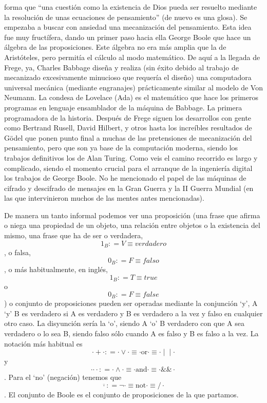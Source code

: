 \documentclass[
]{article}
\begin{document}
\begin{enumerate}
  forma que ``una cuestión como la existencia de Dios pueda ser resuelto
  mediante la resolución de unas ecuaciones de pensamiento'' (de nuevo
  es una glosa). Se empezaba a buscar con ansiedad una mecanización del
  pensamiento. Esta idea fue muy fructífera, dando un primer paso hacia
  ella George Boole que hace un ál\-gebra de las proposiciones. Este
  álgebra no era más amplia que la de Aristóteles, pero permitía el
  cálculo al modo matemático. De aquí a la llegada de Frege, ya, Charles
  Babbage diseña y realiza (sin éxito debido al trabajo de mecanizado
  ex\-cesivamente minucioso que requería el diseño) una computadora
  universal me\-cánica (mediante engranajes) prácticamente similar al
  modelo de Von Neumann. La condesa de Lovelace (Ada) es el matemático
  que hace los primeros progra\-mas en lenguaje ensamblador de la
  máquina de Babbage. La primera programa\-dora de la historia. Después
  de Frege siguen los desarrollos con gente como Ber\-trand Rusell,
  David Hilbert, y otros hasta los increíbles resultados de Gödel que
  ponen punto final a muchas de las pretensiones de mecanización del
  pensamiento, pero que son ya base de la computación moderna, siendo
  los trabajos definitivos los de Alan Turing. Como veis el camino
  recorrido es largo y complicado, siendo el momento crucial para el
  arranque de la ingeniería digital los trabajos de George Boole. No he
  mencionado el papel de las máquinas de cifrado y descifrado de
  mensajes en la Gran Guerra y la II Guerra Mundial (en las que
  intervinieron muchos de las mentes antes mencionadas).

  De manera un tanto informal podemos ver una proposición (una frase que
  afirma o niega una propiedad de un objeto, una relación entre objetos
  o la existencia del mismo, una frase que ha de ser o verdadera,
  \[1_{B}{{: = V} \equiv \mathbf{\mathit{verdadero}}}\], o falsa,
  \[0_{B}{{: = F} \equiv \mathbf{\mathit{falso}}}\], o más
  habitualmente, en inglés,
  \[1_{B}{{: = T} \equiv \mathbf{\mathit{true}}}\] o
  \[0_{B}{{: = F} \equiv \mathbf{\mathit{false}}}\]) o conjunto de
  proposiciones pueden ser operadas mediante la conjunción `y', A `y' B
  es verdadero si A es verdadero y B es verdadero a la vez y falso en
  cualquier otro caso. La disyunción sería la `o', siendo A `o' B
  verdadero con que A sea verdadero o lo sea B, siendo falso sólo cuando
  A es falso y B es falso a la vez. La notación más habitual es
  \[{{{\cdot + \cdot}{: = {\cdot \vee \cdot}}} \equiv \cdot}\text{or}{\cdot \equiv {{\cdot \mid} \mid \cdot}}\]y\[{{{\cdot \mathbf{\cdot} \cdot}{: = {\cdot \land \cdot}}} \equiv \cdot}\text{and}{\cdot \equiv {\cdot \&\& \cdot}}\].
  Para el `no' (negación) tenemos
  que\[{{\overline{\cdot}{: = {\neg \cdot}}} \equiv \text{not}}{\cdot \equiv {/ \cdot}}\].
  El conjunto de Boole es el conjunto de proposiciones de la que
  partamos.


\end{enumerate}
\end{document}
